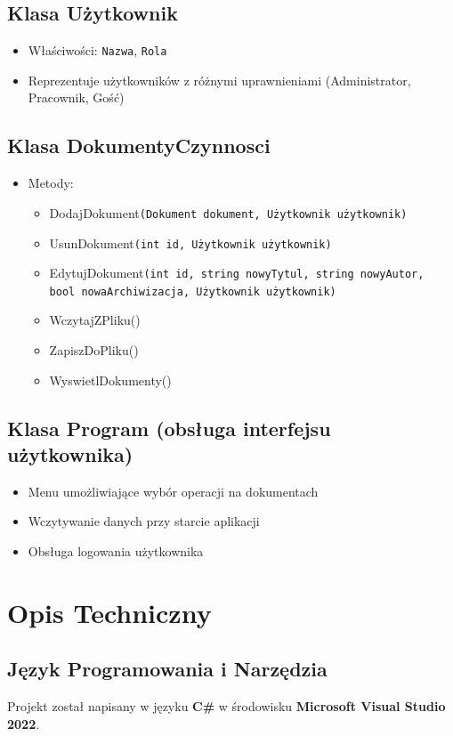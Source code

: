 \subsection{Klasa Użytkownik}
\begin{itemize}
\item Właściwości: \texttt{Nazwa}, \texttt{Rola}
\item Reprezentuje użytkowników z różnymi uprawnieniami (Administrator, Pracownik, Gość)
\end{itemize}

\subsection{Klasa DokumentyCzynnosci}
\begin{itemize}
\item Metody:
\begin{itemize}
\item {DodajDokument}\texttt{(Dokument dokument, Użytkownik użytkownik)}
\item {UsunDokument}\texttt{(int id, Użytkownik użytkownik)}
\item {EdytujDokument}\texttt{(int id, string nowyTytul, string nowyAutor, bool nowaArchiwizacja, Użytkownik użytkownik)}
\item {WczytajZPliku()}
\item {ZapiszDoPliku()}
\item {WyswietlDokumenty()}
\end{itemize}
\end{itemize}

\subsection{Klasa Program (obsługa interfejsu użytkownika)}
\begin{itemize}
\item Menu umożliwiające wybór operacji na dokumentach
\item Wczytywanie danych przy starcie aplikacji
\item Obsługa logowania użytkownika
\end{itemize}

\section{Opis Techniczny}
\subsection{Język Programowania i Narzędzia}
Projekt został napisany w języku \textbf{C\#} w środowisku \textbf{Microsoft Visual Studio 2022}. 

